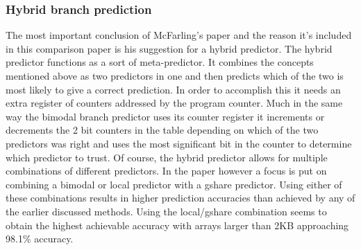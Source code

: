 \subsubsection{Hybrid branch prediction}
The most important conclusion of McFarling's paper and the reason it's included in this comparison paper is his suggestion for a hybrid predictor. The hybrid predictor functions as a sort of meta-predictor. It combines the concepts mentioned above as two predictors in one and then predicts which of the two is most likely to give a correct prediction. In order to accomplish this it needs an extra register of counters addressed by the program counter. Much in the same way the bimodal branch predictor uses its counter register it increments or decrements the 2 bit counters in the table depending on which of the two predictors was right and uses the most significant bit in the counter to determine which predictor to trust. Of course, the hybrid predictor allows for multiple combinations of different predictors. In the paper however a focus is put on combining a bimodal or local predictor with a gshare predictor. Using either of these combinations results in higher prediction accuracies than achieved by any of the earlier discussed methods. Using the local/gshare combination seems to obtain the highest achievable accuracy with arrays larger than 2KB approaching 98.1\% accuracy.